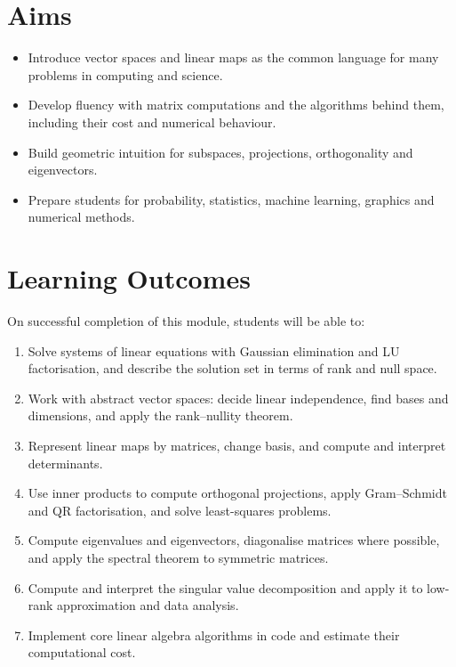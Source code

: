 \documentclass[11pt,a4paper]{article}
\begin{document}
\section{Aims}
\begin{itemize}
  \item Introduce vector spaces and linear maps as the common language for many problems in computing and science.
  \item Develop fluency with matrix computations and the algorithms behind them, including their cost and numerical behaviour.
  \item Build geometric intuition for subspaces, projections, orthogonality and eigenvectors.
  \item Prepare students for probability, statistics, machine learning, graphics and numerical methods.
\end{itemize}

\section{Learning Outcomes}
On successful completion of this module, students will be able to:
\begin{enumerate}[label=LO\arabic*.]
  \item Solve systems of linear equations with Gaussian elimination and LU factorisation, and describe the solution set in terms of rank and null space.
  \item Work with abstract vector spaces: decide linear independence, find bases and dimensions, and apply the rank--nullity theorem.
  \item Represent linear maps by matrices, change basis, and compute and interpret determinants.
  \item Use inner products to compute orthogonal projections, apply Gram--Schmidt and QR factorisation, and solve least-squares problems.
  \item Compute eigenvalues and eigenvectors, diagonalise matrices where possible, and apply the spectral theorem to symmetric matrices.
  \item Compute and interpret the singular value decomposition and apply it to low-rank approximation and data analysis.
  \item Implement core linear algebra algorithms in code and estimate their computational cost.
\end{enumerate}
\end{document}
